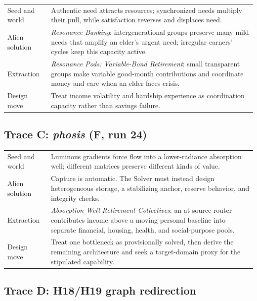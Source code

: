 \documentclass[11pt,a4paper]{article}
\begin{document}
\begin{center}
\footnotesize
\begin{tabularx}{\textwidth}{>{\raggedright\arraybackslash}p{28mm}X}
\toprule
Seed and world & Authentic need attracts resources; synchronized needs multiply their pull, while satisfaction reverses and displaces need. \\
Alien solution & \emph{Resonance Banking}: intergenerational groups preserve many mild needs that amplify an elder's urgent need; irregular earners' cycles keep this capacity active. \\
Extraction & \emph{Resonance Pods: Variable-Bond Retirement}: small transparent groups make variable good-month contributions and coordinate money and care when an elder faces crisis. \\
Design move & Treat income volatility and hardship experience as coordination capacity rather than savings failure. \\
\bottomrule
\end{tabularx}
\end{center}

\subsection*{Trace C: \emph{phosis} (F, run 24)}

\begin{center}
\footnotesize
\begin{tabularx}{\textwidth}{>{\raggedright\arraybackslash}p{28mm}X}
\toprule
Seed and world & Luminous gradients force flow into a lower-radiance absorption well; different matrices preserve different kinds of value. \\
Alien solution & Capture is automatic. The Solver must instead design heterogeneous storage, a stabilizing anchor, reserve behavior, and integrity checks. \\
Extraction & \emph{Absorption Well Retirement Collectives}: an at-source router contributes income above a moving personal baseline into separate financial, housing, health, and social-purpose pools. \\
Design move & Treat one bottleneck as provisionally solved, then derive the remaining architecture and seek a target-domain proxy for the stipulated capability. \\
\bottomrule
\end{tabularx}
\end{center}

\subsection*{Trace D: H18/H19 graph redirection}
\end{document}
